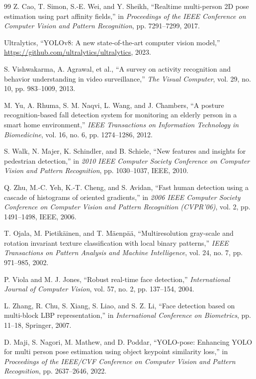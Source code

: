 \documentclass[conference]{IEEEtran}
\begin{document}
\begin{thebibliography}{99}
Z. Cao, T. Simon, S.-E. Wei, and Y. Sheikh, ``Realtime multi-person 2D pose estimation using part affinity fields,'' in \textit{Proceedings of the IEEE Conference on Computer Vision and Pattern Recognition}, pp. 7291--7299, 2017.

Ultralytics, ``YOLOv8: A new state-of-the-art computer vision model,'' \url{https://github.com/ultralytics/ultralytics}, 2023.

S. Vishwakarma, A. Agrawal, et al., ``A survey on activity recognition and behavior understanding in video surveillance,'' \textit{The Visual Computer}, vol. 29, no. 10, pp. 983--1009, 2013.

M. Yu, A. Rhuma, S. M. Naqvi, L. Wang, and J. Chambers, ``A posture recognition-based fall detection system for monitoring an elderly person in a smart home environment,'' \textit{IEEE Transactions on Information Technology in Biomedicine}, vol. 16, no. 6, pp. 1274--1286, 2012.

S. Walk, N. Majer, K. Schindler, and B. Schiele, ``New features and insights for pedestrian detection,'' in \textit{2010 IEEE Computer Society Conference on Computer Vision and Pattern Recognition}, pp. 1030--1037, IEEE, 2010.

Q. Zhu, M.-C. Yeh, K.-T. Cheng, and S. Avidan, ``Fast human detection using a cascade of histograms of oriented gradients,'' in \textit{2006 IEEE Computer Society Conference on Computer Vision and Pattern Recognition (CVPR'06)}, vol. 2, pp. 1491--1498, IEEE, 2006.

T. Ojala, M. Pietik\"ainen, and T. M\"aenp\"a\"a, ``Multiresolution gray-scale and rotation invariant texture classification with local binary patterns,'' \textit{IEEE Transactions on Pattern Analysis and Machine Intelligence}, vol. 24, no. 7, pp. 971--985, 2002.

P. Viola and M. J. Jones, ``Robust real-time face detection,'' \textit{International Journal of Computer Vision}, vol. 57, no. 2, pp. 137--154, 2004.

L. Zhang, R. Chu, S. Xiang, S. Liao, and S. Z. Li, ``Face detection based on multi-block LBP representation,'' in \textit{International Conference on Biometrics}, pp. 11--18, Springer, 2007.

D. Maji, S. Nagori, M. Mathew, and D. Poddar, ``YOLO-pose: Enhancing YOLO for multi person pose estimation using object keypoint similarity loss,'' in \textit{Proceedings of the IEEE/CVF Conference on Computer Vision and Pattern Recognition}, pp. 2637--2646, 2022.


\end{thebibliography}
\end{document}
